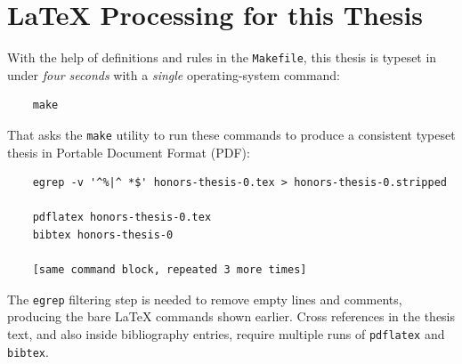 
\chapter* {\LaTeX{} Processing for this Thesis}

With the help of definitions and rules in the \texttt{Makefile}, this
thesis is typeset in under \emph{four seconds} with a \emph{single}
operating-system command:

\begin{Verbatim}
    make
\end{Verbatim}

\noindent
That asks the \texttt{make} utility to run these commands to produce a
consistent typeset thesis in Portable Document Format (PDF):

\begin{Verbatim}
    egrep -v '^%|^ *$' honors-thesis-0.tex > honors-thesis-0.stripped

    pdflatex honors-thesis-0.tex
    bibtex honors-thesis-0

    [same command block, repeated 3 more times]
\end{Verbatim}

\noindent
The \texttt{egrep} filtering step is needed to remove empty lines and
comments, producing the bare \LaTeX{} commands shown earlier.  Cross
references in the thesis text, and also inside bibliography entries,
require multiple runs of \texttt{pdflatex} and \texttt{bibtex}.
